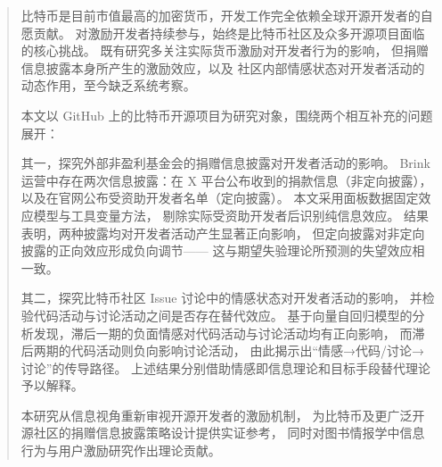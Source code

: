 \begin{abstract}
比特币是目前市值最高的加密货币，开发工作完全依赖全球开源开发者的自愿贡献。
对激励开发者持续参与，始终是比特币社区及众多开源项目面临的核心挑战。
既有研究多关注实际货币激励对开发者行为的影响，
但捐赠信息披露本身所产生的激励效应，以及
社区内部情感状态对开发者活动的动态作用，至今缺乏系统考察。

本文以 GitHub 上的比特币开源项目为研究对象，围绕两个相互补充的问题展开：

其一，探究外部非盈利基金会的捐赠信息披露对开发者活动的影响。
Brink 运营中存在两次信息披露：在 X 平台公布收到的捐款信息（非定向披露），
以及在官网公布受资助开发者名单（定向披露）。
本文采用面板数据固定效应模型与工具变量方法，
剔除实际受资助开发者后识别纯信息效应。
结果表明，两种披露均对开发者活动产生显著正向影响，
但定向披露对非定向披露的正向效应形成负向调节——
这与期望失验理论所预测的失望效应相一致。

其二，探究比特币社区 Issue 讨论中的情感状态对开发者活动的影响，
并检验代码活动与讨论活动之间是否存在替代效应。
基于向量自回归模型的分析发现，滞后一期的负面情感对代码活动与讨论活动均有正向影响，
而滞后两期的代码活动则负向影响讨论活动，
由此揭示出“情感→代码/讨论→讨论”的传导路径。
上述结果分别借助情感即信息理论和目标手段替代理论予以解释。

本研究从信息视角重新审视开源开发者的激励机制，
为比特币及更广泛开源社区的捐赠信息披露策略设计提供实证参考，
同时对图书情报学中信息行为与用户激励研究作出理论贡献。
\end{abstract}

